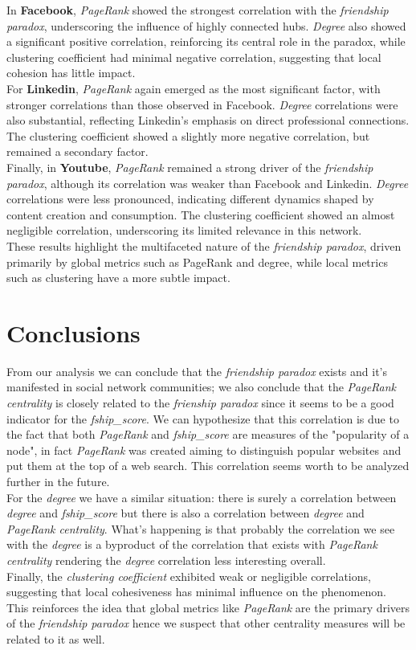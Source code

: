 \documentclass{article}
\begin{document}
In \textbf{Facebook}, \textit{PageRank} showed the strongest correlation with the \textit{friendship paradox}, underscoring the influence of highly connected hubs. \textit{Degree} also showed a significant positive correlation, reinforcing its central role in the paradox, while clustering coefficient had minimal negative correlation, suggesting that local cohesion has little impact. \\
For \textbf{Linkedin}, \textit{PageRank} again emerged as the most significant factor, with stronger correlations than those observed in Facebook. \textit{Degree} correlations were also substantial, reflecting Linkedin's emphasis on direct professional connections. The clustering coefficient showed a slightly more negative correlation, but remained a secondary factor. \\ 
Finally, in \textbf{Youtube}, \textit{PageRank} remained a strong driver of the \textit{friendship paradox}, although its correlation was weaker than Facebook and Linkedin. \textit{Degree} correlations were less pronounced, indicating different dynamics shaped by content creation and consumption. The clustering coefficient showed an almost negligible correlation, underscoring its limited relevance in this network. \\
These results highlight the multifaceted nature of the \textit{friendship paradox}, driven primarily by global metrics such as PageRank and degree, while local metrics such as clustering have a more subtle impact.

\section{Conclusions}
From our analysis we can conclude that the \textit{friendship paradox} exists and it's manifested in social network communities; we also conclude that the \textit{PageRank centrality} is closely related to the \textit{frienship paradox} since it seems to be a good indicator for the \textit{fship\_score}. We can hypothesize that this correlation is due to the fact that both \textit{PageRank} and \textit{fship\_score} are measures of the "popularity of a node", in fact \textit{PageRank} was created aiming to distinguish popular websites and put them at the top of a web search. This correlation seems worth to be analyzed further in the future. \\
For the \textit{degree} we have a similar situation: there is surely a correlation between \textit{degree} and \textit{fship\_score} but there is also a correlation between \textit{degree} and \textit{PageRank centrality}. What's happening is that probably the correlation we see with the \textit{degree} is a byproduct of the correlation that exists with \textit{PageRank centrality} rendering the \textit{degree} correlation less interesting overall.\\
Finally, the \textit{clustering coefficient} exhibited weak or negligible correlations, suggesting that local cohesiveness has minimal influence on the phenomenon. 
This reinforces the idea that global metrics like \textit{PageRank} are the primary drivers of the \textit{friendship paradox} hence we suspect that other centrality measures will be related to it as well.
\end{document}
